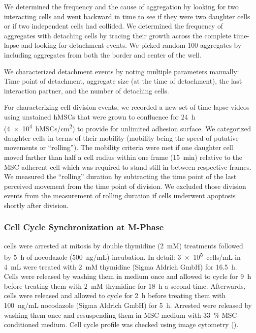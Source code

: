 We determined the frequency and the cause of aggregation by looking for two
interacting \INA cells and went backward in time to see if they were two
daughter cells or if two independent \INA cells had collided. We determined the
frequency of aggregates with detaching cells by tracing their growth across the
complete time-lapse and looking for detachment events. We picked random 100
aggregates by including aggregates from both the border and center of the well.

We characterized detachment events by noting multiple parameters manually: Time
point of detachment, aggregate size (at the time of detachment), the last
interaction partner, and the number of detaching \INA cells.

For characterizing cell division events, we recorded a new set of time-lapse
videos using unstained hMSCs that were grown to confluence for \SI{24}{\hour}
(\SI{4e4}{hMSCs/cm^2}) to provide for unlimited adhesion surface. We categorized
daughter cells in terms of their mobility (mobility being the speed of putative
movements or “rolling”). The mobility criteria were met if one \INA daughter
cell moved farther than half a cell radius within one frame (\SI{15}{\minute})
relative to the MSC-adherent \INA cell which was required to stand still
in-between respective frames. We measured the “rolling” duration by subtracting
the time point of the last perceived movement from the time point of division.
We excluded those division events from the measurement of rolling duration if
\INA cells underwent apoptosis shortly after division.


\subsubsection*{Cell Cycle Synchronization at M-Phase}
\INA cells were arrested at mitosis by double thymidine (\SI{2}{mM}) treatments
followed by \SI{5}{\hour} of nocodazole (\SI{500}{ng/mL}) incubation. In detail:
\SI{3e5}{cells/mL} \INA in \SI{4}{mL} were treated with \SI{2}{mM} thymidine
(Sigma Aldrich GmbH) for \SI{16.5}{\hour}. Cells were released by washing them
in \INA medium once and allowed to cycle for \SI{9}{\hour} before treating them
with \SI{2}{mM} thymidine for \SI{18}{\hour} a second time. Afterwards, cells
were released and allowed to cycle for \SI{2}{\hour} before treating them with
\SI{100}{ng/mL} nocodazole (Sigma Aldrich GmbH) for \SI{5}{\hour}. Arrested
\INA were released by washing them once and resuspending them in MSC-medium
with \SI{33}{\percent} MSC-conditioned medium. Cell cycle profile was checked
using image cytometry ().

